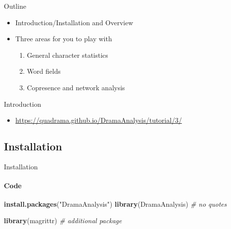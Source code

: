\documentclass[ignorenonframetext,]{beamer}
\newenvironment{Shaded}{\begin{snugshade}}{\end{snugshade}}
\newcommand{\CommentTok}[1]{\textcolor[rgb]{0.56,0.35,0.01}{\textit{#1}}}
\newcommand{\KeywordTok}[1]{\textcolor[rgb]{0.13,0.29,0.53}{\textbf{#1}}}
\newcommand{\NormalTok}[1]{#1}
\newcommand{\StringTok}[1]{\textcolor[rgb]{0.31,0.60,0.02}{#1}}
\providecommand{\tightlist}{%
  \setlength{\itemsep}{0pt}\setlength{\parskip}{0pt}}
\begin{document}
\begin{frame}{Outline}
\protect\hypertarget{outline}{}

\begin{itemize}
\tightlist
\item
  Introduction/Installation and Overview
\item
  Three areas for you to play with

  \begin{enumerate}
  \tightlist
  \item
    General character statistics
  \item
    Word fields
  \item
    Copresence and network analysis
  \end{enumerate}
\end{itemize}

\end{frame}

\begin{frame}{Introduction}
\protect\hypertarget{introduction}{}

\begin{itemize}
\tightlist
\item
  \url{https://quadrama.github.io/DramaAnalysis/tutorial/3/}
\end{itemize}

\end{frame}

\hypertarget{installation}{%
\subsection{Installation}\label{installation}}

\begin{frame}[fragile]{Installation}
\protect\hypertarget{installation-1}{}

\framesubtitle{Code}

\begin{Shaded}
\begin{Highlighting}[]
\KeywordTok{install.packages}\NormalTok{(}\StringTok{"DramaAnalysis"}\NormalTok{)}
\KeywordTok{library}\NormalTok{(DramaAnalysis)  }\CommentTok{# no quotes}

\KeywordTok{library}\NormalTok{(magrittr) }\CommentTok{# additional package}
\end{Highlighting}
\end{Shaded}

\end{frame}
\end{document}
